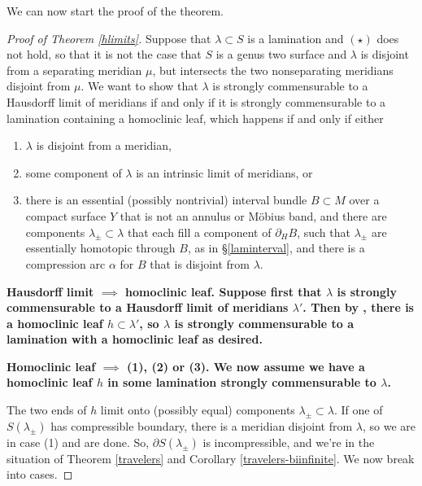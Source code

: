 \documentclass[12pt]{amsart}
\theoremstyle{definition}
\theoremstyle{remark}
\begin{document}
We can now start the proof of the theorem.

\begin{proof}[Proof of Theorem \ref{hlimits}]
Suppose that $\lambda \subset S$ is a lamination and $(\star)$ does not hold, so that it is not the case that $S$ is a genus two surface and $\lambda$ is disjoint from a separating meridian $\mu$, but intersects the two nonseparating meridians disjoint from $\mu$. We want to show that $\lambda$ is strongly commensurable to a Hausdorff limit of meridians if and only if it is strongly commensurable to a lamination containing a homoclinic leaf, which happens if and only if either

\begin{enumerate}
\item $\lambda$ is disjoint from a meridian,
\item some component of $\lambda$ is an intrinsic limit of meridians, or 
\item there is an essential (possibly nontrivial) interval bundle $B \subset M$ over a compact surface $Y$ that is not an annulus or M\"obius band, and there are components $\lambda_\pm \subset \lambda$ that each fill a component of $\partial_H B$, such that $\lambda_\pm$ are essentially homotopic through $B$, as in \S \ref{laminterval}, and there is a compression arc $\alpha$ for $B$ that is disjoint from $\lambda $.
\end{enumerate}

\medskip

\noindent \bf Hausdorff limit $\implies$ homoclinic leaf. \rm  Suppose first that $\lambda$ is strongly commensurable to a Hausdorff limit of meridians $\lambda'$. Then by \cite[Theorem B.1]{Lecuireplissage}, there is a homoclinic leaf $h\subset \lambda'$, so $\lambda$ is strongly commensurable to a lamination with a homoclinic leaf as desired. 

\medskip


\noindent \bf Homoclinic leaf $\implies $ (1), (2) or (3). \rm We now assume we have a homoclinic leaf $h$ in some lamination strongly commensurable to $\lambda$.

The two ends of $h$ limit onto (possibly equal) components $\lambda_\pm\subset \lambda$. If one of $S(\lambda_\pm)$ has compressible boundary, there is a meridian disjoint from $\lambda$, so we are in case (1) and are done. So, $\partial S(\lambda_\pm)$ is incompressible, and we're in the situation of Theorem \ref{travelers} and Corollary \ref{travelers-biinfinite}. We now break into cases. 


\end{proof}
\end{document}
